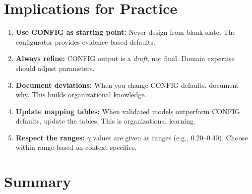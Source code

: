 \section{Implications for Practice}
\label{sec:ggg-practice}

\begin{tcolorbox}[colback=green!5!white, colframe=green!75!black,
    title=Practical Implications]
\begin{enumerate}
\item \textbf{Use CONFIG as starting point:} Never design from blank slate.
    The configurator provides evidence-based defaults.
\item \textbf{Always refine:} CONFIG output is a \textit{draft}, not final.
    Domain expertise should adjust parameters.
\item \textbf{Document deviations:} When you change CONFIG defaults, document
    why. This builds organizational knowledge.
\item \textbf{Update mapping tables:} When validated models outperform CONFIG
    defaults, update the tables. This is organizational learning.
\item \textbf{Respect the ranges:} $\gamma$ values are given as ranges (e.g., 0.20--0.40).
    Choose within range based on context specifics.
\end{enumerate}
\end{tcolorbox}



\section{Summary}
\label{sec:ggg-summary}

